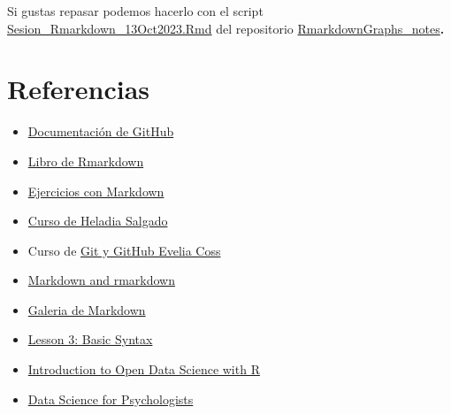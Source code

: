 \documentclass[
  spanish,
  12pt,
  letterpaper,
  DIV=11,
  numbers=noendperiod]{scrreprt}
\providecommand{\tightlist}{%
  \setlength{\itemsep}{0pt}\setlength{\parskip}{0pt}}
\begin{document}
\begin{tcolorbox}[enhanced jigsaw, arc=.35mm, bottomrule=.15mm, bottomtitle=1mm, breakable, colback=white, colbacktitle=quarto-callout-note-color!10!white, colframe=quarto-callout-note-color-frame, coltitle=black, left=2mm, leftrule=.75mm, opacityback=0, opacitybacktitle=0.6, rightrule=.15mm, title=\textcolor{quarto-callout-note-color}{\faInfo}\hspace{0.5em}{Nota}, titlerule=0mm, toprule=.15mm, toptitle=1mm]

Si gustas repasar podemos hacerlo con el script
\href{https://github.com/EveliaCoss/RmarkdownGraphs_notes/blob/main/Sesion_Rmarkdown_13Oct2023.Rmd}{Sesion\_Rmarkdown\_13Oct2023.Rmd}
del repositorio
\href{https://github.com/EveliaCoss/RmarkdownGraphs_notes/tree/main}{RmarkdownGraphs\_notes}\textbf{.}

\end{tcolorbox}

\section{Referencias}\label{referencias-16}

\begin{itemize}
\tightlist
\item
  \href{https://docs.github.com/es/get-started/writing-on-github/getting-started-with-writing-and-formatting-on-github/basic-writing-and-formatting-syntax}{Documentación
  de GitHub}
\item
  \href{https://michael-franke.github.io/intro-data-analysis/ch-01-01-Rmarkdown.html}{Libro
  de Rmarkdown}
\item
  \href{https://www.markdowntutorial.com/es/lesson/1/}{Ejercicios con
  Markdown}
\item
  \href{https://lcg-cursos.github.io/material/introbioinfo/}{Curso de
  Heladia Salgado}
\item
  Curso de
  \href{https://eveliacoss.github.io/Workshop_GitGithub2025/Parte2.html}{Git
  y GitHub Evelia Coss}
\item
  \href{https://faculty.washington.edu/otoomet/info201-book/markdown.html}{Markdown
  and rmarkdown}
\item
  \href{https://rmarkdown.rstudio.com/gallery.html}{Galeria de Markdown}
\item
  \href{https://zsmith27.github.io/rmarkdown_crash-course/lesson-3-basic-syntax.html}{Lesson
  3: Basic Syntax}
\item
  \href{https://carpentries-incubator.github.io/open-science-with-r/aio/index.html}{Introduction
  to Open Data Science with R}
\item
  \href{https://bookdown.org/hneth/ds4psy/}{Data Science for
  Psychologists}
\end{itemize}
\end{document}
